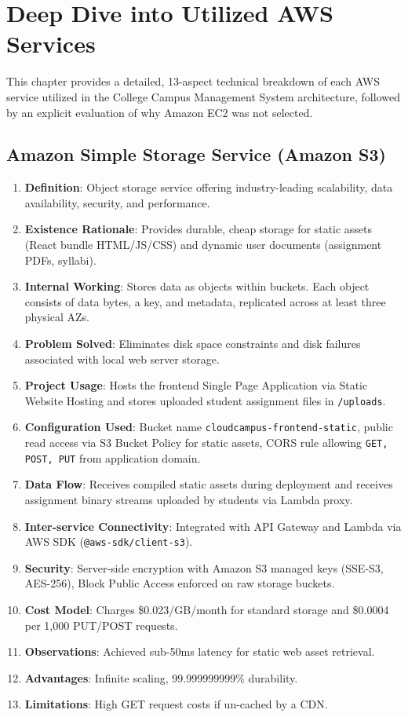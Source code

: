 \chapter{Deep Dive into Utilized AWS Services}
\label{chap:aws_services}

This chapter provides a detailed, 13-aspect technical breakdown of each AWS service utilized in the College Campus Management System architecture, followed by an explicit evaluation of why Amazon EC2 was not selected.

\section{Amazon Simple Storage Service (Amazon S3)}
\begin{enumerate}
    \item \textbf{Definition}: Object storage service offering industry-leading scalability, data availability, security, and performance.
    \item \textbf{Existence Rationale}: Provides durable, cheap storage for static assets (React bundle HTML/JS/CSS) and dynamic user documents (assignment PDFs, syllabi).
    \item \textbf{Internal Working}: Stores data as objects within buckets. Each object consists of data bytes, a key, and metadata, replicated across at least three physical AZs.
    \item \textbf{Problem Solved}: Eliminates disk space constraints and disk failures associated with local web server storage.
    \item \textbf{Project Usage}: Hosts the frontend Single Page Application via Static Website Hosting and stores uploaded student assignment files in \texttt{/uploads}.
    \item \textbf{Configuration Used}: Bucket name \texttt{cloudcampus-frontend-static}, public read access via S3 Bucket Policy for static assets, CORS rule allowing \texttt{GET, POST, PUT} from application domain.
    \item \textbf{Data Flow}: Receives compiled static assets during deployment and receives assignment binary streams uploaded by students via Lambda proxy.
    \item \textbf{Inter-service Connectivity}: Integrated with API Gateway and Lambda via AWS SDK (\texttt{@aws-sdk/client-s3}).
    \item \textbf{Security}: Server-side encryption with Amazon S3 managed keys (SSE-S3, AES-256), Block Public Access enforced on raw storage buckets.
    \item \textbf{Cost Model}: Charges \$0.023/GB/month for standard storage and \$0.0004 per 1,000 PUT/POST requests.
    \item \textbf{Observations}: Achieved sub-50ms latency for static web asset retrieval.
    \item \textbf{Advantages}: Infinite scaling, 99.999999999\% durability.
    \item \textbf{Limitations}: High GET request costs if un-cached by a CDN.
\end{enumerate}


